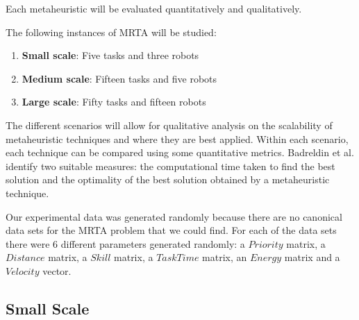 \documentclass[a4paper]{article}
\begin{document}



Each metaheuristic will be evaluated quantitatively and qualitatively.

The following instances of MRTA will be studied:
\begin{enumerate}
\item \textbf{Small scale}: Five tasks and three robots
\item \textbf{Medium scale}: Fifteen tasks and five robots
\item \textbf{Large scale}: Fifty tasks and fifteen robots
\end{enumerate}

The different scenarios will allow for qualitative analysis on the scalability of metaheuristic techniques and where they are best applied. Within each scenario, each technique can be compared using some quantitative metrics. Badreldin et al. \cite{Badreldin} identify two suitable measures: the computational time taken to find the best solution and the optimality of the best solution obtained by a metaheuristic technique.

Our experimental data was generated randomly because there are no canonical data sets for the MRTA problem that we could find. For each of the data sets there were 6 different parameters generated randomly: a $\mathit{Priority}$ matrix, a $\mathit{Distance}$ matrix, a $\mathit{Skill}$ matrix, a $\mathit{Task Time}$ matrix, an $\mathit{Energy}$ matrix and a $\mathit{Velocity}$ vector.

\subsection{Small Scale}
\end{document}
